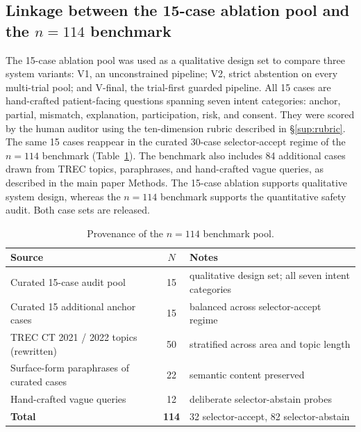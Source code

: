 \documentclass[pdflatex,Numbered]{sn-jnl}
\begin{document}
\subsection{Linkage between the 15-case ablation pool and the $n=114$ benchmark}
\label{sup:linkage}
The 15-case ablation pool was used as a qualitative design set to compare three system variants: V1, an unconstrained pipeline; V2, strict abstention on every multi-trial pool; and V-final, the trial-first guarded pipeline. All 15 cases are hand-crafted patient-facing questions spanning seven intent categories: anchor, partial, mismatch, explanation, participation, risk, and consent. They were scored by the human auditor using the ten-dimension rubric described in \S\ref{sup:rubric}. The same 15 cases reappear in the curated 30-case selector-accept regime of the $n=114$ benchmark (Table~\ref{tab:case_provenance}). The benchmark also includes 84 additional cases drawn from TREC topics, paraphrases, and hand-crafted vague queries, as described in the main paper Methods. The 15-case ablation supports qualitative system design, whereas the $n=114$ benchmark supports the quantitative safety audit. Both case sets are released.

\begin{table}[!htbp]
\centering
\caption{Provenance of the $n=114$ benchmark pool.}
\label{tab:case_provenance}
\small
\begin{tabular}{l c l}
\toprule
Source & $N$ & Notes \\
\midrule
Curated 15-case audit pool                   & 15  & qualitative design set; all seven intent categories \\
Curated 15 additional anchor cases           & 15  & balanced across selector-accept regime \\
TREC CT 2021 / 2022 topics (rewritten)       & 50  & stratified across area and topic length \\
Surface-form paraphrases of curated cases    & 22  & semantic content preserved \\
Hand-crafted vague queries                   & 12  & deliberate selector-abstain probes \\
\midrule
\textbf{Total}                               & \textbf{114} & 32 selector-accept, 82 selector-abstain \\
\bottomrule
\end{tabular}
\end{table}



\end{document}
